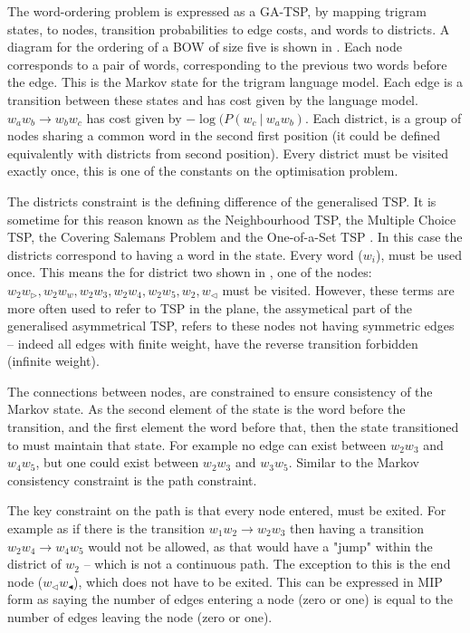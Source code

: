 \documentclass[11pt]{article}
\theoremstyle{plain}
\theoremstyle{definition}
\begin{document}
The word-ordering problem is expressed as a GA-TSP, by mapping trigram states, to nodes, transition probabilities to edge costs, and words to districts. A diagram for the ordering of a BOW of size five is shown in . Each node corresponds to a pair of words, corresponding to the previous two words before the edge. This is the Markov state for the trigram language model. Each edge is a transition between these states and has cost given by the language model. $w_aw_b\to w_bw_c$ has cost given by $-\log(P(w_c\:|\:w_aw_b)$. Each district, is a group of nodes sharing a common word in the second first position (it could be defined equivalently with districts from second position). Every district must be visited exactly once, this is one of the constants on the optimisation problem.


The districts constraint is the defining difference of the generalised TSP. It is sometime for this reason known as the Neighbourhood TSP, the Multiple Choice TSP, the Covering Salemans Problem and the One-of-a-Set TSP \parencite{Gudmundsson1999}. In this case the districts correspond to having a word in the state. Every word ($w_i$), must be used once. This means the for district two shown in , one of the nodes: ${w_2w_\triangleright, w_2w_w,w_2w_3,w_2w_4, w_2w_5, w_2,w_\triangleleft}$ must be visited.
However, these terms are more often used to refer to TSP in the plane, the assymetical part of the generalised asymmetrical TSP, refers to these nodes not having symmetric edges -- indeed all edges with finite weight, have the reverse transition forbidden (infinite weight).

The connections between nodes, are constrained to ensure consistency of the Markov state. As the second element of the state is the word before the transition, and the first element the word before that, then the state transitioned to must maintain that state. For example no edge can exist between $w_2w_3$ and $w_4w_5$, but one could exist between $w_2w_3$ and $w_3w_5$. Similar to the Markov consistency constraint is the path constraint.


The key constraint on the path is that every node entered, must be exited. For example as if there is the transition $w_1w_2 \to w_2w_3$ then having a transition $w_2w_4\to w_4w_5$ would not be allowed, as that would have a "jump" within the district  of $w_2$ -- which is not a continuous path. The exception to this is the end node ($w_\triangleleft w_\blacktriangleleft$), which does not have to be exited. This can be expressed in MIP form as saying the number of edges entering a node (zero or one) is equal to the number of edges leaving the node (zero or one).
\end{document}
